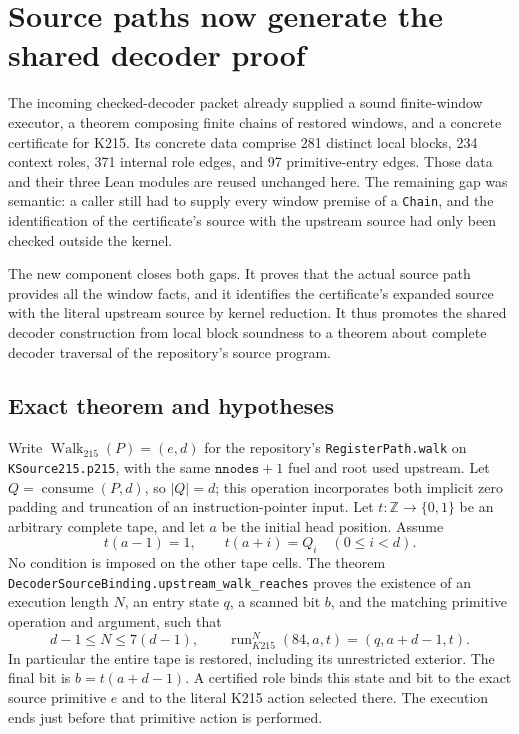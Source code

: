 \section{Source paths now generate the shared decoder proof}
\label{sec:decoder-source-paths}

The incoming checked-decoder packet already supplied a sound finite-window
executor, a theorem composing finite chains of restored windows, and a concrete
certificate for K215. Its concrete data comprise 281 distinct local blocks,
234 context roles, 371 internal role edges, and 97 primitive-entry edges.
Those data and their three Lean modules are reused unchanged here. The
remaining gap was semantic: a caller still had to supply every window premise
of a \texttt{Chain}, and the identification of the certificate's source with
the upstream source had only been checked outside the kernel.

The new component closes both gaps. It proves that the actual source path
provides all the window facts, and it identifies the certificate's expanded
source with the literal upstream source by kernel reduction. It thus promotes
the shared decoder construction from local block soundness to a theorem about
complete decoder traversal of the repository's source program.

\subsection{Exact theorem and hypotheses}

Write $\operatorname{Walk}_{215}(P)=(e,d)$ for the repository's
\texttt{RegisterPath.walk} on \texttt{KSource215.p215}, with the same
$\texttt{nnodes}+1$ fuel and root used upstream. Let
$Q=\operatorname{consume}(P,d)$, so $|Q|=d$; this operation incorporates both
implicit zero padding and truncation of an instruction-pointer input.
Let $t:\mathbb Z\to\{0,1\}$ be an arbitrary complete tape, and let $a$ be the
initial head position. Assume
\[
 t(a-1)=1,\qquad t(a+i)=Q_i\quad(0\leq i<d).
\]
No condition is imposed on the other tape cells. The theorem
\texttt{DecoderSourceBinding.upstream\_walk\_reaches} proves the existence of
an execution length $N$, an entry state $q$, a scanned bit $b$, and the matching
primitive operation and argument, such that
\[
 d-1\leq N\leq 7(d-1),\qquad
 \operatorname{run}_{K215}^{N}(84,a,t)
   =(q,a+d-1,t).
\]
In particular the entire tape is restored, including its unrestricted
exterior. The final bit is $b=t(a+d-1)$. A certified role binds this state and
bit to the exact source primitive $e$ and to the literal K215 action selected
there. The execution ends just before that primitive action is performed.

